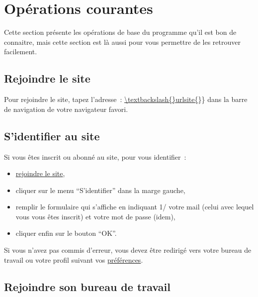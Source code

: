 % 
% 
% 
% 
% 
% 
% 
% 

\section{Opérations courantes}\hypertarget{operations-courantes}{}\label{operations-courantes}

Cette section présente les opérations de base du programme \unan{} qu'il est bon de connaitre, mais cette section est là aussi pour vous permettre de les retrouver facilement.

\subsection{Rejoindre le site}\hypertarget{rejoindre-le-site}{}\label{rejoindre-le-site}

Pour rejoindre le site, tapez l'adresse~{}: \url{\textbackslash{}urlsite\{}\}\} dans la barre de navigation de votre navigateur favori.

\subsection{S'identifier au site}\hypertarget{vous-identifier}{}\label{vous-identifier}

Si vous êtes inscrit ou abonné au site, pour vous identifier~{}:

\begin{itemize}
\item \hyperlink{rejoindre-le-site}{rejoindre le site},
\item cliquer sur le menu ``S'identifier'' dans la marge gauche,
\item remplir le formulaire qui s'affiche en indiquant 1/ votre mail (celui avec lequel vous vous êtes inscrit) et votre mot de passe (idem),
\item cliquer enfin sur le bouton ``OK''.
\end{itemize}

Si vous n'avez pas commis d'erreur, vous devez être redirigé vers votre bureau de travail ou votre profil suivant vos \hyperlink{preferences-auteur}{préférences}.

\subsection{Rejoindre son bureau de travail}\hypertarget{rejoindre-bureau-travail}{}\label{rejoindre-bureau-travail}

